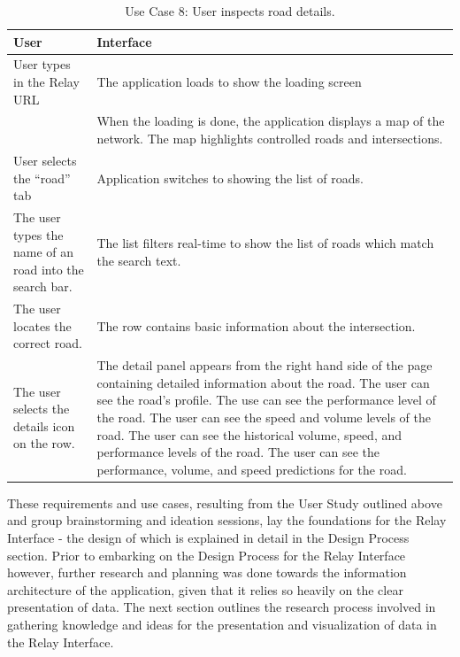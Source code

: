 \documentclass{report}
\begin{document}
\begin{table}[htbp]
\begin{centering}
    \begin{tabular}{| p{7cm} | p{7cm} |}
    \hline
    User    & Interface   \\ \hline
    User types in the Relay URL    &     The application loads to show the loading screen    \\ \hline
    ~      & When the loading is done, the application displays a map of the network. The map highlights controlled roads and intersections. \\ \hline
     User selects the ``road'' tab  &   Application switches to showing the list of roads.          \\ \hline
     The user types the name of an road into the search bar.     &    The list filters real-time to show the list of roads which match the search text.           \\ \hline
     The user locates the correct road.    &    The row contains basic information about the intersection.    \\ \hline
     The user selects the details icon on the row.     &     The detail panel appears from the right hand side of the page containing detailed information about the road. The user can see the road's profile. The use can see the performance level of the road. The user can see the speed and volume levels of the road. The user can see the historical volume, speed, and performance levels of the road. The user can see the performance, volume, and speed predictions for the road.     \\ \hline
    \end{tabular}
    \caption {Use Case 8: User inspects road details.}
    \label{use-case-8}
   \end{centering}
\end{table}

These requirements and use cases, resulting from the User Study outlined above and group brainstorming and ideation sessions, lay the foundations for the Relay Interface - the design of which is explained in detail in the Design Process section.
Prior to embarking on the Design Process for the Relay Interface however, further research and planning was done towards the information architecture of the application, given that it relies so heavily on the clear presentation of data.
The next section outlines the research process involved in gathering knowledge and ideas for the presentation and visualization of data in the Relay Interface.
\end{document}
